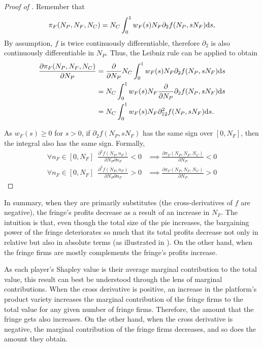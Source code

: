 \begin{proof}[Proof of ]
    Remember that
    \begin{align*}
        \pi_F(N_P, N_F, N_C) = N_C \int_0^1 w_F(s) N_F \partial_2 f(N_P, s N_F) \mathrm{d}s,
    \end{align*}
    By assumption, $f$ is twice continuously differentiable, therefore $\partial_2$ is also continuously differentiable in $N_P$.
    Thus, the Leibniz rule can be applied to obtain
    \begin{align*}
        \frac{\partial \pi_F(N_P, N_F, N_C)}{\partial N_P} &= \frac{\partial}{\partial N_P} N_C \int_0^1 w_F(s) N_F \partial_2 f(N_P, s N_F) \mathrm{d}s \\
        &= N_C \int_0^1 w_F(s) N_F \frac{\partial}{\partial N_P} \partial_2 f(N_P, s N_F) \mathrm{d}s \\
        &= N_C \int_0^1 w_F(s) N_F \partial^2_{12} f(N_P, s N_F) \mathrm{d}s.
    \end{align*}

    As $w_F(s) \geq 0$ for $s > 0$, if $\partial_2 f(N_P, s N_F)$ has the same sign over $[0, N_F]$, then the integral also has the same sign.
    Formally,
    \begin{align*}
        \forall n_F \in [0, N_F] \enspace \frac{\partial^2 f(N_P, n_F)}{\partial N_P \partial n_F} < 0 &\implies \frac{\partial \pi_F(N_P, N_F, N_C)}{\partial N_P} < 0 \\
        \forall n_F \in [0, N_F] \enspace \frac{\partial^2 f(N_P, n_F)}{\partial N_P \partial n_F} > 0 &\implies \frac{\partial \pi_F(N_P, N_F, N_C)}{\partial N_P} > 0
    \end{align*}
\end{proof}
In summary, when they are primarily substitutes (the cross-derivatives of $f$ are negative), the fringe's profits decrease as a result of an increase in $N_F$.
The intuition is that, even though the total size of the pie increases, the bargaining power of the fringe deteriorates so much that its total profits decrease not only in relative but also in absolute terms (as illustrated in ).
On the other hand, when the fringe firms are mostly complements the fringe's profits increase.

As each player's Shapley value is their average marginal contribution to the total value, this result can best be understood through the lens of marginal contributions.
When the cross derivative is positive, an increase in the platform's product variety increases the marginal contribution of the fringe firms to the total value for any given number of fringe firms.
Therefore, the amount that the fringe gets also increases.
On the other hand, when the cross derivative is negative, the marginal contribution of the fringe firms decreases, and so does the amount they obtain.

